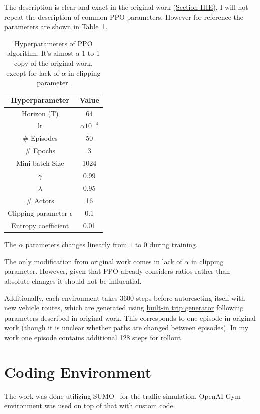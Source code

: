 \documentclass{article}
\begin{document}
    The description is clear and exact in the original work (\href{https://arxiv.org/pdf/1808.01876.pdf#subsection.3.5}{Section IIIE}),
    I will not repeat the description of common PPO parameters.
    However for reference the parameters are shown in Table~\ref{tab:ppo-hyperparams}.
    \begin{table}[h]
        \centering
        \begin{tabular}{cc}
            \textbf{Hyperparameter} & \textbf{Value} \\
            \hline
            Horizon (T) & 64 \\
            lr & $\alpha 10^{-4}$ \\
            \# Episodes & 50 \\
            \# Epochs & 3 \\
            Mini-batch Size & 1024 \\
            $\gamma$ & 0.99 \\
            $\lambda$ & 0.95 \\
            \# Actors & 16 \\
            Clipping parameter $\epsilon$ & 0.1 \\
            Entropy coefficient & 0.01 \\
        \end{tabular}
        \caption{
            Hyperparameters of PPO algorithm.
            It's almost a 1-to-1 copy of the original work, except for lack of $\alpha$ in clipping parameter.
        }
        \label{tab:ppo-hyperparams}
    \end{table}
    The $\alpha$ parameters changes linearly from $1$ to $0$ during training.

    The only modification from original work comes in lack of $\alpha$ in clipping parameter.
    However, given that PPO already considers ratios rather than absolute changes it should not be influential.

    Additionally, each environment takes 3600 steps before autoreseting itself with new vehicle routes,
    which are generated using \href{https://sumo.dlr.de/docs/Tools/Trip.html}{built-in trip generator} following parameters described in original work.
    This corresponds to one episode in original work (though it is unclear whether paths are changed between episodes).
    In my work one episode contains additional 128 steps for rollout.

    \section{Coding Environment}
    The work was done utilizing SUMO~\cite{sumo} for the traffic simulation.
    OpenAI Gym~\cite{gym} environment was used on top of that with custom code.
\end{document}
